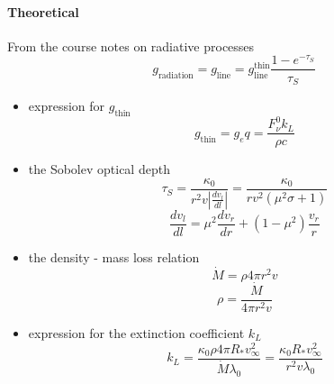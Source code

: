 \documentclass[../main/main.tex]{subfiles}
\begin{document}
\paragraph{Theoretical}
From the course notes on radiative processes
\begin{equation}
\boxed{g_{\text{radiation}} = g_{\text{line}} = g_{\text{line}}^{\text{thin}} \frac{1- e^{-\tau_S}}{\tau_S}}
\end{equation}
\begin{itemize}
\item expression for $g_{\text{thin}}$ \begin{equation}
g_{\text{thin}} = g_e q = \frac{F_{\nu}^0 k_L}{\rho c}
\end{equation}

\item the Sobolev optical depth
\begin{equation}
\tau_S = \frac{\kappa_0}{r^2 v \left| \frac{dv_l}{dl} \right| } = \frac{\kappa_0}{rv^2 (\mu^2 \sigma + 1)}
\end{equation}
\begin{equation}
\frac{dv_l}{dl} = \mu^2\frac{dv_r}{dr} + (1- \mu^2)\frac{v_r}{r}
\end{equation}

\item the density - mass loss relation
\begin{equation}
\dot{M} = \rho 4 \pi r^2 v
\end{equation}
\begin{equation}
\rho = \frac{\dot{M}}{4 \pi r^2 v}
\end{equation}

\item expression for the extinction coefficient $k_L$ \\
\noindent{}
\begin{equation}
k_L = \frac{\kappa_0 \rho 4 \pi R_* v_{\infty}^2}{\dot{M} \lambda_0} = \frac{\kappa_0 R_* v_{\infty}^2}{r^2 v \lambda_0} 
\label{expression_for_k_L}
\end{equation}
\end{itemize}
\end{document}

